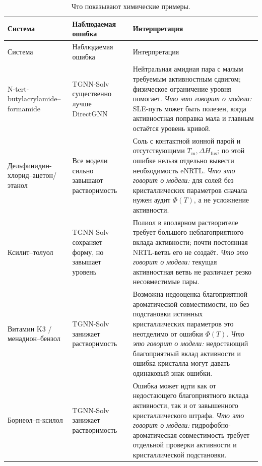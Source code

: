 \documentclass[11pt]{article}
\newcommand{\Tm}{T_{\mathrm m}}
\newcommand{\dHfus}{\Delta H_{\mathrm{fus}}}
\theoremstyle{definition}
\begin{document}
{\small
\setlength{\LTleft}{0pt}
\setlength{\LTright}{0pt}
\begin{longtable}{P{0.27\textwidth}P{0.33\textwidth}P{0.34\textwidth}}
\caption{Что показывают химические примеры.}\label{tab:chemical-examples}\\
\toprule
Система & Наблюдаемая ошибка & Интерпретация \\
\midrule
\endfirsthead
\toprule
Система & Наблюдаемая ошибка & Интерпретация \\
\midrule
\endhead
\bottomrule
\endfoot
\bottomrule
\endlastfoot
N-tert-butylacrylamide--formamide & TGNN-Solv существенно лучше DirectGNN & Нейтральная амидная пара с малым требуемым активностным сдвигом; физическое ограничение уровня помогает. \newline\emph{Что это говорит о модели:} SLE-путь может быть полезен, когда активностная поправка мала и главным остаётся уровень кривой. \\
Дельфинидин-хлорид--ацетон/этанол & Все модели сильно завышают растворимость & Соль с контактной ионной парой и отсутствующими $\Tm,\dHfus$; по этой ошибке нельзя отдельно вывести необходимость eNRTL. \newline\emph{Что это говорит о модели:} для солей без кристаллических параметров сначала нужен аудит $\Phi(T)$, а не усложнение активности. \\
Ксилит--толуол & TGNN-Solv сохраняет форму, но завышает уровень & Полиол в аполярном растворителе требует большого неблагоприятного вклада активности; почти постоянная NRTL-ветвь его не создаёт. \newline\emph{Что это говорит о модели:} текущая активностная ветвь не различает резко несовместимые пары. \\
Витамин K3 / менадион--бензол & TGNN-Solv занижает растворимость & Возможна недооценка благоприятной ароматической совместимости, но без подстановки истинных кристаллических параметров это неотделимо от ошибки $\Phi(T)$. \newline\emph{Что это говорит о модели:} недостающий благоприятный вклад активности и ошибка кристалла могут давать одинаковый знак ошибки. \\
Борнеол--п-ксилол & TGNN-Solv занижает растворимость & Ошибка может идти как от недостающего благоприятного вклада активности, так и от завышенного кристаллического штрафа. \newline\emph{Что это говорит о модели:} гидрофобно-ароматическая совместимость требует отдельной проверки активности и кристаллической подстановки. \\
\end{longtable}
}
\end{document}
